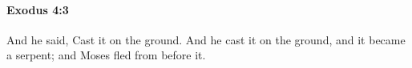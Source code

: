
		\paragraph{Exodus 4:3} %
			\label{EXODUS-4-3}

			And he said, Cast it on the ground. And he cast it on the ground, and it became a serpent; and Moses fled from before it.


